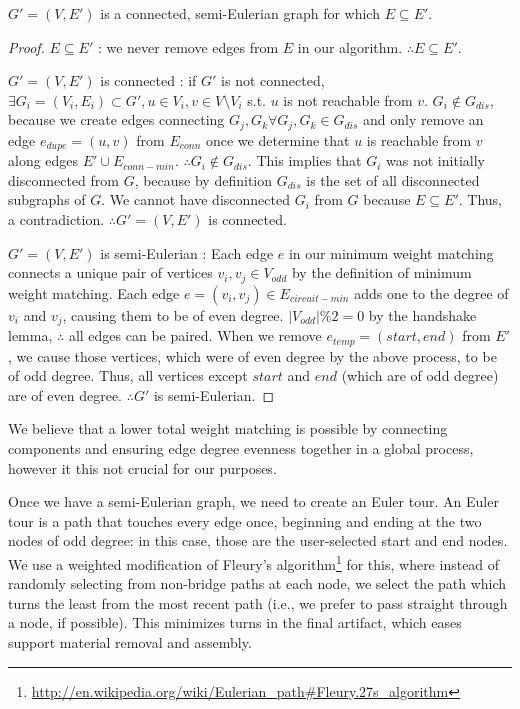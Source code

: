 \begin{theorem}
 $G' = (V, E')$ is a connected, semi-Eulerian graph for which $E \subseteq E'$. 
\end{theorem}
\begin{proof}
$E \subseteq E'$ : we never remove edges from $E$ in our algorithm.  $\therefore E \subseteq E'$.

$G' = (V, E')$ is connected : if $G'$ is not connected, $\exists G_i = (V_i, E_i) \subset G', u \in V_i, v\in V \setminus V_i$ s.t. $u$ is not reachable from $v$.  $G_i \not\in G_{dis}$, because we create edges connecting $G_j, G_k \forall G_j, G_k \in G_{dis}$ and only remove an edge $e_{dupe} = (u, v)$ from $E_{conn}$ once we determine that $u$ is reachable from $v$ along edges $E' \cup E_{conn-min}$.  $\therefore G_i \not\in G_{dis}$.  This implies that $G_i$ was not initially disconnected from $G$, because by definition $G_{dis}$ is the set of all disconnected subgraphs of $G$.  We cannot have disconnected $G_i$ from $G$ because $E \subseteq E'$.  Thus, a contradiction.  $\therefore G' = (V, E')$ is connected.

$G' = (V, E')$ is semi-Eulerian : Each edge $e$ in our minimum weight matching connects a unique pair of vertices $v_i, v_j \in V_{odd}$ by the definition of minimum weight matching.  Each edge $e = (v_i, v_j) \in E_{circuit-min}$ adds one to the degree of $v_i$ and $v_j$, causing them to be of even degree. $|V_{odd}| \% 2 = 0$ by the handshake lemma, $\therefore$ all edges can be paired.  When we remove $e_{temp} = (start, end)$ from $E'$, we cause those vertices, which were of even degree by the above process, to be of odd degree.  Thus, all vertices except $start$ and $end$ (which are of odd degree) are of even degree.  $\therefore G'$ is semi-Eulerian.
\end{proof}

We believe that a lower total weight matching is possible by connecting components and ensuring edge degree evenness together in a global process, however it this not crucial for our purposes.

Once we have a semi-Eulerian graph, we need to create an Euler tour.  An Euler tour is a path that touches every edge once, beginning and ending at the two nodes of odd degree: in this case, those are the user-selected start and end nodes.  We use a weighted modification of Fleury's algorithm\footnote{\url{http://en.wikipedia.org/wiki/Eulerian_path\#Fleury.27s_algorithm}} for this, where instead of randomly selecting from non-bridge paths at each node, we select the path which turns the least from the most recent path (i.e., we prefer to pass straight through a node, if possible).  This minimizes turns in the final artifact, which eases support material removal and assembly.

